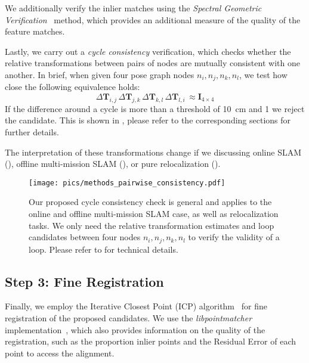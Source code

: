 
We additionally verify the inlier matches using the \emph{Spectral Geometric Verification}~\cite{vidanapathirana2023ral} method, which provides an additional measure of the quality of the feature matches.

Lastly, we carry out a \emph{cycle consistency} verification, which checks whether the relative transformations between pairs of nodes are mutually consistent with one another. In brief, when given four pose graph nodes $n_i, n_j, n_k, n_l$, we test how close the following equivalence holds:
\begin{equation}
\Delta\mathbf{T}_{i,j}\, \Delta\mathbf{T}_{j,k}\, \Delta\mathbf{T}_{k,l}\, \Delta\mathbf{T}_{l,i}\, \approx \mathbf{I}_{4\times4} 
\end{equation}
If the difference around a cycle is more than a threshold of \SI{10}{\centi\meter} and \SI{1}{\degrees} we reject the candidate. This is shown in , please refer to the corresponding sections for further details.

The interpretation of these transformations change if we discussing online SLAM (), offline multi-mission SLAM (), or pure relocalization (). 

\begin{figure}[t]
  \centering
  \texttt{[image: pics/methods\_pairwise\_consistency.pdf]}
  \caption{Our proposed cycle consistency check is general and applies to the online and offline multi-mission SLAM case, as well as relocalization tasks. We only need the relative transformation estimates and loop candidates between four nodes $n_i, n_j, n_k, n_l$ to verify the validity of a loop. Please refer to  for technical details.}
  \label{fig:cycle-consistency}
\end{figure}

\subsection*{\textbf{Step 3: Fine Registration}}
\label{subsubsec:fine-registration}
Finally, we employ the Iterative Closest Point (ICP) algorithm~\cite{besl1992icp} for fine registration of the proposed candidates. We use the \emph{libpointmatcher} implementation~\cite{pomerleau2013iros}, which also provides information on the quality of the registration, such as the proportion inlier points and the Residual Error of each point to access the alignment.

